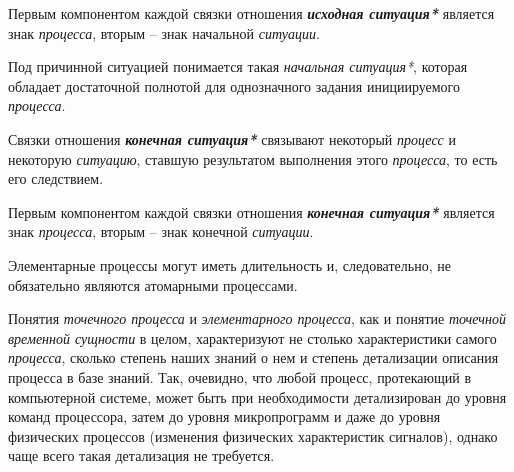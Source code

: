 Первым компонентом каждой связки отношения \textbf{\textit{исходная ситуация*}} является знак \textit{процесса}, вторым -- знак начальной \textit{ситуации}.
		
\begin{SCn}
\end{SCn}

Под причинной ситуацией понимается такая \textit{начальная ситуация*}, которая обладает достаточной полнотой для однозначного задания инициируемого \textit{процесса}.
		
\begin{SCn}
\end{SCn}

Связки отношения \textbf{\textit{конечная ситуация*}} связывают некоторый \textit{процесс} и некоторую \textit{ситуацию}, ставшую результатом выполнения этого \textit{процесса}, то есть его следствием.
			
Первым компонентом каждой связки отношения \textbf{\textit{конечная ситуация*}} является знак \textit{процесса}, вторым -- знак конечной \textit{ситуации}.
		
\begin{SCn}
		
\end{SCn}

Элементарные процессы могут иметь длительность и, следовательно, не обязательно являются атомарными процессами.

Понятия \textit{точечного процесса} и \textit{элементарного процесса}, как и понятие \textit{точечной временной сущности} в целом, характеризуют не столько характеристики самого \textit{процесса}, сколько степень наших знаний о нем и степень детализации описания процесса в базе знаний. Так, очевидно, что любой процесс, протекающий в компьютерной системе, может быть при необходимости детализирован до уровня команд процессора, затем до уровня микропрограмм и даже до уровня физических процессов (изменения физических характеристик сигналов), однако чаще всего такая детализация не требуется.

